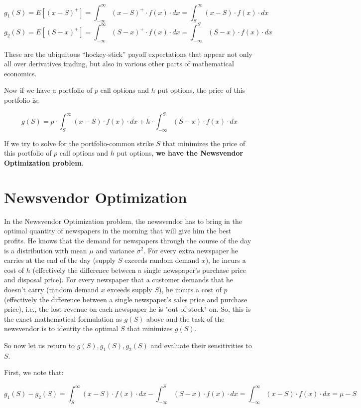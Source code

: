 \documentclass[11pt, oneside]{article}   	%
\begin{document}
$$g_1(S) = E[(x-S)^+] = \int_{-\infty}^{\infty} (x-S)^+ \cdot f(x) \cdot dx = \int_S^{\infty} (x-S) \cdot f(x) \cdot dx$$
$$g_2(S) = E[(S-x)^+] = \int_{-\infty}^{\infty} (S-x)^+ \cdot f(x) \cdot dx = \int_{-\infty}^S (S-x) \cdot f(x) \cdot dx$$

These are the ubiquitous ``hockey-stick'' payoff expectations that appear not only all over derivatives trading, but also in various other parts of mathematical economics.

Now if we have a portfolio of $p$ call options and $h$ put options, the price of this portfolio is:

$$g(S) = p \cdot \int_S^{\infty} (x-S) \cdot f(x) \cdot dx + h \cdot \int_{-\infty}^S (S-x) \cdot f(x) \cdot dx$$

If we try to solve for the portfolio-common strike $S$ that minimizes the price of this portfolio of $p$ call options and $h$ put options, {\bf we have the Newsvendor Optimization problem}.

\section{Newsvendor Optimization}
In the Newsvendor Optimization problem, the newsvendor has to bring in the optimal quantity of newspapers in the morning that will give him the best profits. He knows that the demand for newspapers through the course of the day is a distribution with mean $\mu$ and variance $\sigma^2$. For every extra newspaper he carries at the end of the day (supply $S$ exceeds random demand $x$), he incurs a cost of $h$ (effectively the difference between a single newspaper's purchase price and disposal price). For every newspaper that a customer demands that he doesn't carry (random demand $x$ exceeds supply $S$), he incurs a cost of $p$ (effectively the difference between a single newspaper's sales price and purchase price), i.e., the lost revenue on each newspaper he is "out of stock" on. So, this is the exact mathematical formulation as $g(S)$ above and the task of the newsvendor is to identity the optimal $S$ that minimizes $g(S)$.

So now let us return to $g(S), g_1(S), g_2(S)$ and evaluate their sensitivities to $S$.

First, we note that:

$$g_1(S) - g_2(S) = \int_S^{\infty} (x-S) \cdot f(x) \cdot dx - \int_{-\infty}^S (S-x) \cdot f(x) \cdot dx = \int_{-\infty}^{\infty} (x-S) \cdot f(x) \cdot dx = \mu - S$$
\end{document}
